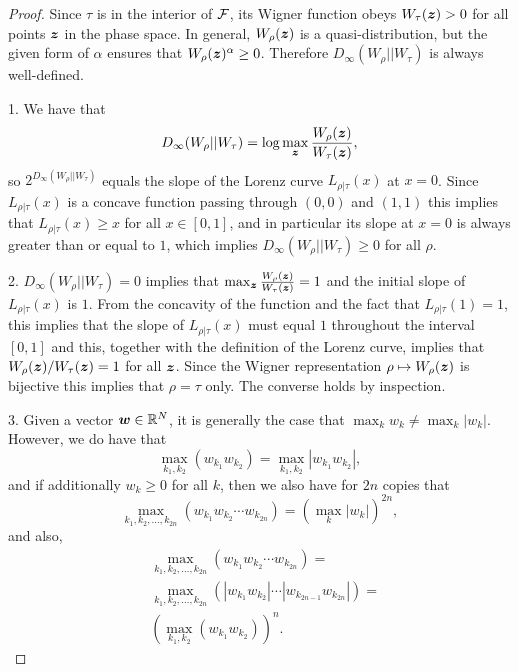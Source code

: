 \documentclass[pra,
aps,
twocolumn,
superscriptaddress,
groupedaddress,
nofootinbib,
reprint
]{revtex4-1}
\begin{document}
\begin{proof}
	Since $\tau$ is in the interior of ${\mathcal F}$, its Wigner function obeys $W_\tau(\bm{z}) >0$ for all points $\bm{z}$ in the phase space. 
In general, $W_\rho(\bm{z})$ is a quasi-distribution, but the given form of $\alpha$ ensures that $W_{\rho}(\bm{z})^\alpha \geq 0$. 
Therefore $D_\infty (W_\rho || W_\tau)$ is always well-defined.

1. We have that 
\begin{equation}
	D_\infty(W_\rho || W_\tau) =\log  \max_{\bm{z}} \frac{W_\rho(\boldsymbol{z})}{W_\tau(\boldsymbol{z})},
\end{equation}
so $2^{D_\infty(W_\rho || W_\tau)}$ equals the slope of the Lorenz curve $L_{\rho|\tau}(x)$ at $x=0$. Since $L_{\rho|\tau}(x)$ is a concave function passing through $(0,0)$ and $(1,1)$ this implies that $L_{\rho |\tau}(x) \ge x$ for all $x \in [0,1]$, and in particular its slope at $x=0$ is always greater than or equal to $1$, which implies $D_\infty(W_\rho || W_\tau) \geq 0$ for all $\rho$.

2. $D_\infty(W_\rho || W_\tau) = 0$ implies that $\max_{\bm{z}} \frac{W_\rho(\bm{z})}{W_\tau(\bm{z})}=1$ and the initial slope of $L_{\rho|\tau}(x)$ is $1$. From the concavity of the function and the fact that $L_{\rho|\tau}(1)=1$, this implies that the slope of $L_{\rho|\tau}(x)$ must equal $1$ throughout the interval $[0,1]$ and this, together with the definition of the Lorenz curve, implies that $W_\rho(\bm{z})/W_\tau(\bm{z}) = 1$ for all $\bm{z}$. Since the Wigner representation $\rho \mapsto W_\rho(\bm{z})$ is bijective this implies that $\rho = \tau$ only. The converse holds by inspection.

3. Given a vector $\boldsymbol{w} \in \mathbb{R}^N$, it is generally the case that $\max_k w_k \ne \max_k |w_k|$. 
However, we do have that
\begin{equation}
	\max_{k_1,k_2} (w_{k_1} w_{k_2}) = \max_{k_1,k_2} |w_{k_1} w_{k_2}|,
\end{equation}
and if additionally $w_k \geq 0$ for all $k$, then we also have for $2n$ copies that
\begin{equation}
	\max_{k_1, k_2, \dots, k_{2n}} \left( w_{k_1}w_{k_2}\cdots w_{k_{2n}} \right) = (\max_k |w_k|)^{2n},
\end{equation}
and also,
\begin{align}
	&\max_{k_1, k_2, \dots, k_{2n}}\left( w_{k_1}w_{k_2}\cdots w_{k_{2n}} \right) = \nonumber\\
	&\max_{k_1, k_2, \dots, k_{2n}}\left( |w_{k_1}w_{k_2}|\cdots |w_{k_{2n-1}}w_{k_{2n}}| \right) = \nonumber \\
	&\left( \max_{k_1 ,k_2}\left( w_{k_1} w_{k_2} \right) \right)^n.
\end{align}


\end{proof}
\end{document}

